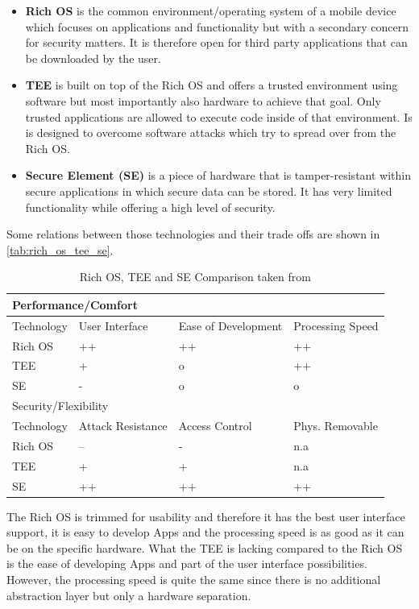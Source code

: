 \begin{itemize}
\item \textbf{Rich OS} is the common environment/operating system of a mobile device which focuses on applications and functionality but with a secondary concern for security matters. It is therefore open for third party applications
that can be downloaded by the user.
\item \textbf{TEE} is built on top of the Rich OS and offers a trusted environment using software but most importantly also hardware to achieve that goal. Only trusted applications are allowed to execute code inside of that environment. Is is designed to overcome software attacks which try to spread over from the Rich OS.
\item \textbf{Secure Element (SE)} is a piece of hardware that is tamper-resistant within secure applications in which secure data can be stored. It has very limited functionality while offering a high level of security.
\end{itemize}
Some relations between those technologies and their trade offs are shown in \autoref{tab:rich_os_tee_se}.
\begin{table}[htb]
  \caption[Rich OS, TEE and SE Comparison]{Rich OS, TEE and SE Comparison taken from \parencite{tee_guide}}
  \label{tab:rich_os_tee_se}
  \begin{tabular}{l l l l}
  \toprule
  \multicolumn{4}{l}{Performance/Comfort}\\
  \midrule
  Technology & User Interface & Ease of Development & Processing Speed \\
  \midrule
  Rich OS & ++ & ++ & ++ \\
  TEE     & +  & o  & ++ \\
  SE      & -  & o  & o  \\
  \bottomrule
  \multicolumn{4}{l}{Security/Flexibility}\\
  \midrule
  Technology & Attack Resistance & Access Control & Phys. Removable \\
  \midrule
  Rich OS & -- & - & n.a\\
  TEE & + & + & n.a \\
  SE & ++ & ++ & ++ \\
  \bottomrule
  \end{tabular}
\end{table}
The Rich OS is trimmed for usability and therefore it has the best
user interface support, it is easy to develop Apps and the processing speed is as good as it can be on the specific hardware. What the TEE is lacking compared to the Rich OS is the ease of developing Apps and part of the user interface possibilities. However, the processing speed is quite the same since there is no additional abstraction layer but only a hardware separation.
